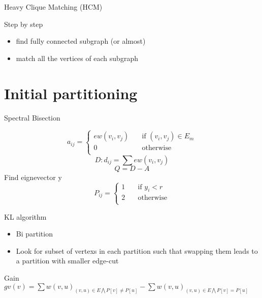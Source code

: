 \documentclass{beamer}
\begin{document}
\begin{frame}{Heavy Clique Matching (HCM)}
	\begin{block}{Step by step}
		 \begin{itemize}
			\item find fully connected subgraph (or almost)
			\item match all the vertices of each subgraph
		 \end{itemize}
	\end{block}
\end{frame}
\author[W.~Pei]{Q.~Diaferia \and T.~Levasseur \and W.~Pei \and G.~Perez Bada}
\section{Initial partitioning}

\begin{frame}{Spectral Bisection}

 \[a_{ij} =
  \begin{cases}
    ew(v_{i},v_{j})     & \quad \text{if } (v_{i},v_{j})  \in E_{m}\\
    0 & \quad \text{otherwise}\\
  \end{cases}
\]
 \[ D: d_{ij} = \sum ew(v_{i},v_{j}) \]
 \[ Q = D-A \]
 Find eignevector y
  \[ P_{ij} =
  \begin{cases}
   1    & \quad \text{if } y_{i} < r \\
 2 & \quad \text{otherwise}\\
  \end{cases}
\]
\end{frame}



\begin{frame}{KL algorithm}
	\begin{itemize}
		\item Bi partition
		\item Look for subset of vertexs in each partition such that swapping them leads to a partition with smaller edge-cut
	\end{itemize}
	\begin{block}{Gain}
		 $gv(v) = \sum w(v,u)_{(v,u)\in E\bigwedge P[v]\neq P[u]} - \sum w(v,u)_{(v,u)\in E\bigwedge P[v]= P[u] }$
	\end{block}
\end{frame}
\end{document}
